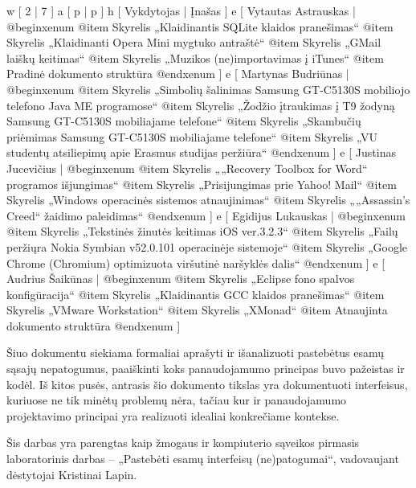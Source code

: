 
\xtable
{
  w [ 2  | 7 ]
  a [ p  | p ]
  h [ Vykdytojas | Įnašas ]
  e [ Vytautas Astrauskas 
  | @begin{xenum} 
      @item Skyrelis „Klaidinantis SQLite klaidos pranešimas“
      @item Skyrelis „Klaidinanti Opera Mini mygtuko antraštė“ 
      @item Skyrelis „GMail laiškų keitimas“
      @item Skyrelis „Muzikos (ne)importavimas į iTunes“
      @item Pradinė dokumento struktūra
    @end{xenum}
  ]
  e [ Martynas Budriūnas
  | @begin{xenum} 
      @item Skyrelis „Simbolių šalinimas Samsung GT-C5130S mobiliojo telefono Java ME programose“
      @item Skyrelis „Žodžio įtraukimas į T9 žodyną Samsung GT-C5130S mobiliajame telefone“
      @item Skyrelis „Skambučių priėmimas Samsung GT-C5130S mobiliajame telefone“
      @item Skyrelis „VU studentų atsiliepimų apie Erasmus studijas peržiūra“
    @end{xenum}
  ]
  e [ Justinas Jucevičius 
  | @begin{xenum} 
      @item Skyrelis „„Recovery Toolbox for Word“ programos išjungimas“
      @item Skyrelis „Prisijungimas prie Yahoo! Mail“
      @item Skyrelis „Windows operacinės sistemos atnaujinimas“
      @item Skyrelis „„Assassin's Creed“ žaidimo paleidimas“
    @end{xenum}
  ]
  e [ Egidijus Lukauskas 
  | @begin{xenum} 
      @item Skyrelis „Tekstinės žinutės keitimas iOS ver.3.2.3“
      @item Skyrelis „Failų peržiųra Nokia Symbian v52.0.101 operacinėje sistemoje“
      @item Skyrelis „Google Chrome (Chromium) optimizuota viršutinė naršyklės dalis“
    @end{xenum}
  ]
  e [ Audrius Šaikūnas 
  | @begin{xenum} 
      @item Skyrelis „Eclipse fono spalvos konfigūracija“
      @item Skyrelis „Klaidinantis GCC klaidos pranešimas“ 
      @item Skyrelis „VMware Workstation“
      @item Skyrelis „XMonad“
      @item Atnaujinta dokumento struktūra
    @end{xenum}
  ]
}

Šiuo dokumentu siekiama formaliai aprašyti ir išanalizuoti pastebėtus esamų sąsajų nepatogumus,
paaiškinti koks panaudojamumo principas buvo pažeistas ir kodėl. Iš kitos pusės, antrasis šio
dokumento tikslas yra dokumentuoti interfeisus, kuriuose ne tik minėtų problemų nėra, tačiau kur
ir panaudojamumo projektavimo principai yra realizuoti idealiai konkrečiame kontekse.

Šis darbas yra parengtas kaip žmogaus ir kompiuterio sąveikos pirmasis laboratorinis darbas
– „Pastebėti esamų interfeisų (ne)patogumai“, vadovaujant dėstytojai Kristinai Lapin.
